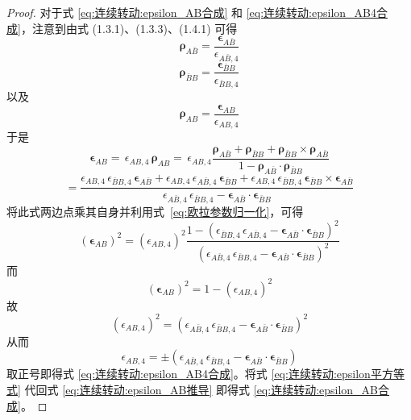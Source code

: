\begin{proof}
对于式 \eqref{eq:连续转动:epsilon_AB合成} 和 \eqref{eq:连续转动:epsilon_AB4合成}，注意到由式 (1.3.1)、(1.3.3)、(1.4.1) 可得
\begin{equation}\label{eq:连续转动:rho_Abar_B}
\boldsymbol{\rho}_{A\bar B}=\frac{\boldsymbol{\epsilon}_{A\bar B}}{\epsilon_{A\bar B,4}}
\end{equation}
\begin{equation}\label{eq:连续转动:rho_Bar_B_B}
\boldsymbol{\rho}_{\bar B B}=\frac{\boldsymbol{\epsilon}_{\bar B B}}{\epsilon_{\bar B B,4}}
\end{equation}
以及
\begin{equation}\label{eq:连续转动:rho_AB}
\boldsymbol{\rho}_{AB}=\frac{\boldsymbol{\epsilon}_{AB}}{\epsilon_{AB,4}}
\end{equation}
于是
\begin{equation}\label{eq:连续转动:epsilon_AB推导}
\boldsymbol{\epsilon}_{AB}=\,\epsilon_{AB,4}\,\boldsymbol{\rho}_{AB}=\,\epsilon_{AB,4}\frac{\boldsymbol{\rho}_{A\bar B}+\boldsymbol{\rho}_{\bar B B}+\boldsymbol{\rho}_{\bar B B}\times\boldsymbol{\rho}_{A\bar B}}{1-\boldsymbol{\rho}_{A\bar B}\cdot\boldsymbol{\rho}_{\bar B B}}
\end{equation}
$$
=\frac{\epsilon_{AB,4}\,\epsilon_{\bar B B,4}\,\boldsymbol{\epsilon}_{A\bar B}+\epsilon_{AB,4}\,\epsilon_{A\bar B,4}\,\boldsymbol{\epsilon}_{\bar B B}+\epsilon_{AB,4}\,\epsilon_{\bar B B,4}\,\boldsymbol{\epsilon}_{\bar B B}\times\boldsymbol{\epsilon}_{A\bar B}}{\epsilon_{A\bar B,4}\,\epsilon_{\bar B B,4}-\boldsymbol{\epsilon}_{A\bar B}\cdot\boldsymbol{\epsilon}_{\bar B B}}
$$
将此式两边点乘其自身并利用式~\eqref{eq:欧拉参数归一化}，可得
\begin{equation}\label{eq:连续转动:epsilon模平方}
(\boldsymbol{\epsilon}_{AB})^{2}=(\epsilon_{AB,4})^{2}\frac{1-(\epsilon_{\bar B B,4}\,\epsilon_{A\bar B,4}-\boldsymbol{\epsilon}_{A\bar B}\cdot\boldsymbol{\epsilon}_{\bar B B})^{2}}{(\epsilon_{A\bar B,4}\,\epsilon_{\bar B B,4}-\boldsymbol{\epsilon}_{A\bar B}\cdot\boldsymbol{\epsilon}_{\bar B B})^{2}}
\end{equation}
而
\begin{equation}\label{eq:连续转动:epsilon模平方约束}
(\boldsymbol{\epsilon}_{AB})^{2}=1-(\epsilon_{AB,4})^{2}
\end{equation}
故
\begin{equation}\label{eq:连续转动:epsilon平方等式}
(\epsilon_{AB,4})^{2}=(\epsilon_{A\bar B,4}\,\epsilon_{\bar B B,4}-\boldsymbol{\epsilon}_{A\bar B}\cdot\boldsymbol{\epsilon}_{\bar B B})^{2}
\end{equation}
从而
$$
\epsilon_{AB,4}=\pm(\epsilon_{A\bar B,4}\,\epsilon_{\bar B B,4}-\boldsymbol{\epsilon}_{A\bar B}\cdot\boldsymbol{\epsilon}_{\bar B B})
$$
取正号即得式 \eqref{eq:连续转动:epsilon_AB4合成}。将式 \eqref{eq:连续转动:epsilon平方等式} 代回式 \eqref{eq:连续转动:epsilon_AB推导} 即得式 \eqref{eq:连续转动:epsilon_AB合成}。


\end{proof}
